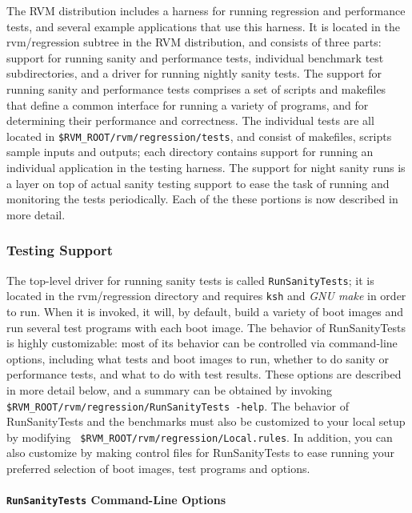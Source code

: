 
 The RVM distribution includes a harness for running regression and
performance tests, and several example applications that use this
harness.  It is located in the rvm/regression subtree in the RVM
distribution, and consists of three parts: support for running sanity
and performance tests, individual benchmark test subdirectories, and a
driver for running nightly sanity tests.  The support for running
sanity and performance tests comprises a set of scripts and makefiles
that define a common interface for running a variety of programs, and
for determining their performance and correctness.  The individual
tests are all located in {\tt{\$RVM\_ROOT/rvm/regression/tests}}, and
consist of makefiles, scripts sample inputs and outputs; each
directory contains support for running an individual application in
the testing harness.  The support for night sanity runs is a layer on
top of actual sanity testing support to ease the task of running and
monitoring the tests periodically.  Each of the these portions is now
described in more detail.

\subsubsection{Testing Support}

  The top-level driver for running sanity tests is called
{\tt{RunSanityTests}}; it is located in the rvm/regression directory
and requires {\tt{ksh}} and {\em{GNU make}} in order to run.  When it
is invoked, it will, by default, build a variety of boot images and
run several test programs with each boot image.  The behavior of
RunSanityTests is highly customizable: most of its behavior can be
controlled via command-line options, including what tests and boot
images to run, whether to do sanity or performance tests, and what to
do with test results. These options are described in more detail
below, and a summary can be obtained by invoking {\tt
\$RVM\_ROOT/rvm/regression/RunSanityTests -help}.  The behavior of
RunSanityTests and the benchmarks must also be customized to your
local setup by modifying {\tt
\$RVM\_ROOT/rvm/regression/Local.rules}.  In addition, you can also
customize by making control files for RunSanityTests to ease running
your preferred selection of boot images, test programs and options.

\paragraph{{\tt{RunSanityTests}} Command-Line Options}

